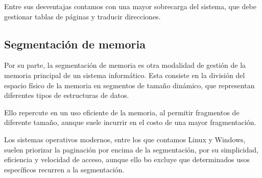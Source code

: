 \documentclass[12pt]{article}
\begin{document}
Entre sus desventajas contamos con una mayor sobrecarga del sistema,
que debe gestionar tablas de páginas y traducir direcciones.

\subsection{Segmentación de memoria}

Por su parte, la segmentación de memoria es otra modalidad de gestión de 
la memoria principal de un sistema informático. Esta consiste en la 
división del espacio físico de la memoria en segmentos de tamaño dinámico,
que representan diferentes tipos de estructuras de datos.

Ello repercute en un uso eficiente de la memoria, 
al permitir fragmentos de diferente tamaño, aunque suele incurrir en el 
costo de una mayor fragmentación.

Los sistemas operativos modernos,
entre los que contamos Linux y Windows,
suelen priorizar la paginación por encima de la segmentación,
por su simplicidad, eficiencia y velocidad de acceso,
aunque ello bo excluye que determinados usos específicos recurren a la 
segmentación.
\end{document}
